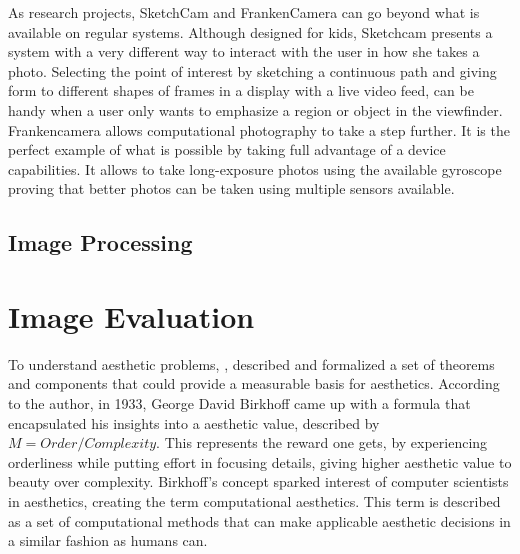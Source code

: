 As research projects, SketchCam and FrankenCamera can go beyond what is available on regular systems. Although designed for kids, Sketchcam presents a system with a very different way to interact with the user in how she takes a photo. Selecting the point of interest by sketching a continuous path and giving form to different shapes of frames in a display with a live video feed, can be handy when a user only wants to emphasize a region or object in the viewfinder.
Frankencamera allows computational photography to take a step further. It is the perfect example of what is possible by taking full advantage of a device capabilities. It allows to take long-exposure photos using the available gyroscope proving that better photos can be taken using multiple sensors available.


\subsection{Image Processing}


\section{Image Evaluation}
\label{sec:photo_eval}
To understand aesthetic problems, \citeauthor{Hoenig2005} \cite{Hoenig2005}, described and formalized a set of theorems and components that could provide a measurable basis for aesthetics.
According to the author, in 1933, George David Birkhoff came up with a formula that encapsulated his insights into a aesthetic value, described by $ M = Order/Complexity $. This represents the reward one gets, by experiencing orderliness while putting effort in focusing details, giving higher aesthetic value to beauty over complexity. Birkhoff's concept sparked interest of computer scientists in aesthetics, creating the term computational aesthetics. This term is described as a set of computational methods that can make applicable aesthetic decisions in a similar fashion as humans can.

